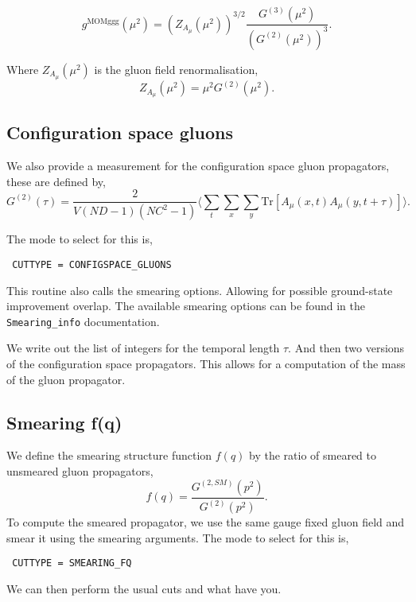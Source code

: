 \documentclass[12pt]{article}
\begin{document}
\begin{equation}
g^{\text{MOMggg}}(\mu^2) = \left(Z_{A_\mu}(\mu^2)\right)^{3/2} \frac{G^{(3)}(\mu^2)}{\left(G^{(2)}(\mu^2)\right)^3}. 
\end{equation}

Where $Z_{A_\mu}(\mu^2)$ is the gluon field renormalisation,
\begin{equation}
 Z_{A_\mu}(\mu^2) = \mu^2 G^{(2)}(\mu^2).
\end{equation}

\subsection{Configuration space gluons}

We also provide a measurement for the configuration space gluon propagators, these are defined by,
\begin{equation}
 G^{(2)}(\tau) = \frac{2}{V(ND-1)(NC^2-1)}\langle \sum_t \sum_x \sum_y \text{Tr}\left[A_\mu(x,t) A_\mu(y,t+\tau)\right]\rangle.
\end{equation}

The mode to select for this is,
\begin{verbatim}
 CUTTYPE = CONFIGSPACE_GLUONS
\end{verbatim}

This routine also calls the smearing options. Allowing for possible ground-state improvement overlap. The available smearing options can be found in the \verb|Smearing_info| documentation.

We write out the list of integers for the temporal length $\tau$. And then two versions of the configuration space propagators. This allows for a computation of the mass of the gluon propagator.

\subsection{Smearing f(q)}

We define the smearing structure function $f(q)$ by the ratio of smeared to unsmeared gluon propagators,
\begin{equation}
 f(q) = \frac{G^{(2,SM)}(p^2)}{G^{(2)}(p^2)}.
\end{equation}
To compute the smeared propagator, we use the same gauge fixed gluon field and smear it using the smearing arguments. The mode to select for this is,
\begin{verbatim}
 CUTTYPE = SMEARING_FQ
\end{verbatim}
We can then perform the usual cuts and what have you.
\end{document}
